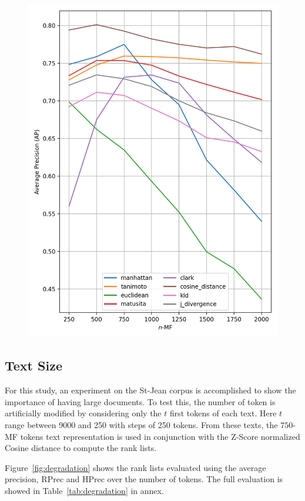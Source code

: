 \begin{figure}
  \label{fig:lemmas}
  \includegraphics[width=0.9\linewidth]{img/mf_lemmas.png}
\end{figure}

\subsection{Text Size\label{sec:importance_of_text_size}}

For this study, an experiment on the St-Jean corpus is accomplished to show the importance of having large documents.
To test this, the number of token is artificially modified by considering only the $t$ first tokens of each text.
Here $t$ range between 9000 and 250 with steps of 250 tokens.
From these texts, the $750$-MF tokens text representation is used in conjunction with the Z-Score normalized Cosine distance to compute the rank lists.

Figure~\ref{fig:degradation} shows the rank lists evaluated using the average precision, RPrec and HPrec over the number of tokens.
The full evaluation is showed in Table~\ref{tab:degradation} in annex.

